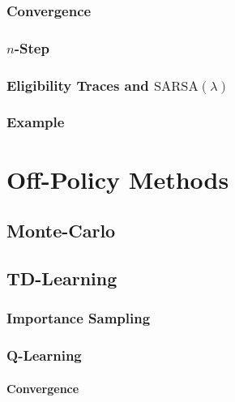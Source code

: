 			\subsubsection{Convergence} %

			\subsubsection{\(n\)-Step} %

			\subsubsection{Eligibility Traces and \( \text{SARSA}(\lambda) \)} %

			\subsubsection{Example} %

	\section{Off-Policy Methods} %

		\subsection{Monte-Carlo} %

		\subsection{TD-Learning} %

			\subsubsection{Importance Sampling} %

			\subsubsection{Q-Learning} %

				\paragraph{Convergence} %

